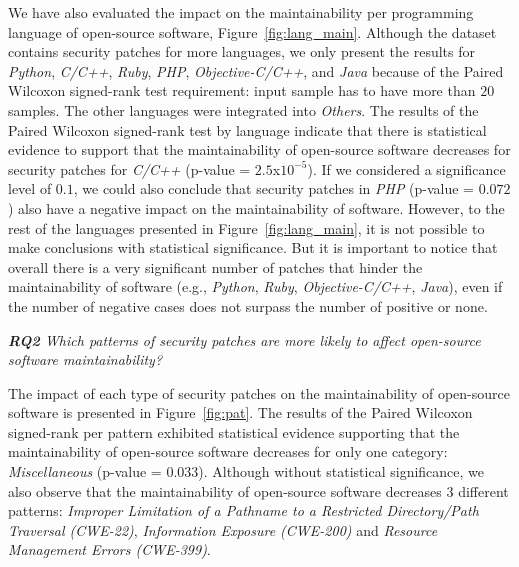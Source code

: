 \documentclass[sigconf,review]{acmart}
\begin{document}
We have also evaluated the impact on the maintainability per programming language
of open-source software, Figure~\ref{fig:lang_main}. Although
the dataset contains security patches for more languages, we only
present the results for \emph{Python}, \emph{C/C++}, \emph{Ruby}, \emph{PHP}, 
\emph{Objective-C/C++}, and \emph{Java}
because of the Paired Wilcoxon signed-rank test requirement: input sample has to have more 
than $20$ samples. The other languages were
integrated into \emph{Others}. The results of the Paired Wilcoxon signed-rank
test by language indicate that there is statistical evidence to support that the
maintainability of open-source software decreases for security patches for \emph{C/C++} 
(p-value = $2.5$x$10^{-5}$).
If we considered a significance level of $0.1$, we could also conclude that security 
patches in \emph{PHP} (p-value = $0.072$) also have a negative impact
on the maintainability of software.
However, to the rest of the languages presented in Figure~\ref{fig:lang_main}, it is
not possible to make conclusions with statistical significance. But it is important
to notice that overall there is a very significant number of patches that
hinder the maintainability of software (e.g., \emph{Python}, \emph{Ruby}, 
\emph{Objective-C/C++}, \emph{Java}), even if the number of negative cases does not 
surpass the number of positive or none. 

\begin{framed}
\textit{\textbf{RQ2} Which patterns of security patches are more likely to
affect open-source software maintainability?}
\vspace{-0.1cm}
\end{framed}
\vspace{-0.1cm}

The impact of each type of security patches on the maintainability of
open-source software is presented in Figure~\ref{fig:pat}. The results of the
Paired Wilcoxon signed-rank per pattern exhibited statistical
evidence supporting that the maintainability of open-source software decreases for
only one category: \emph{Miscellaneous} (p-value = $0.033$). Although without 
statistical significance, we also observe that the maintainability of open-source software decreases $3$ different patterns: \emph{Improper Limitation of a Pathname to a Restricted Directory/Path Traversal (CWE-22)}, \emph{Information Exposure (CWE-200)} and \emph{Resource Management Errors (CWE-399)}.
\end{document}
